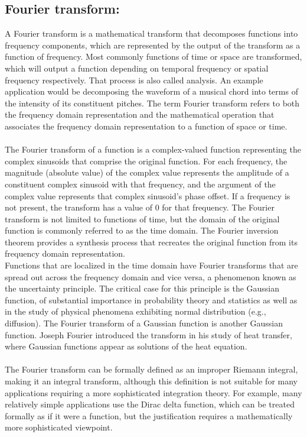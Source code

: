\documentclass[12pt,a4paper]{article}
\begin{document}
\subsection{Fourier transform:}
A Fourier transform is a mathematical transform that decomposes functions into frequency components, which are represented by the output of the transform as a function of frequency. Most commonly functions of time or space are transformed, which will output a function depending on temporal frequency or spatial frequency respectively. That process is also called analysis. An example application would be decomposing the waveform of a musical chord into terms of the intensity of its constituent pitches. The term Fourier transform refers to both the frequency domain representation and the mathematical operation that associates the frequency domain representation to a function of space or time.\\
\\The Fourier transform of a function is a complex-valued function representing the complex sinusoids that comprise the original function. For each frequency, the magnitude (absolute value) of the complex value represents the amplitude of a constituent complex sinusoid with that frequency, and the argument of the complex value represents that complex sinusoid's phase offset. If a frequency is not present, the transform has a value of 0 for that frequency. The Fourier transform is not limited to functions of time, but the domain of the original function is commonly referred to as the time domain. The Fourier inversion theorem provides a synthesis process that recreates the original function from its frequency domain representation.\\
\clearpage
\noindent
Functions that are localized in the time domain have Fourier transforms that are spread out across the frequency domain and vice versa, a phenomenon known as the uncertainty principle. The critical case for this principle is the Gaussian function, of substantial importance in probability theory and statistics as well as in the study of physical phenomena exhibiting normal distribution (e.g., diffusion). The Fourier transform of a Gaussian function is another Gaussian function. Joseph Fourier introduced the transform in his study of heat transfer, where Gaussian functions appear as solutions of the heat equation.\\
\\The Fourier transform can be formally defined as an improper Riemann integral, making it an integral transform, although this definition is not suitable for many applications requiring a more sophisticated integration theory. For example, many relatively simple applications use the Dirac delta function, which can be treated formally as if it were a function, but the justification requires a mathematically more sophisticated viewpoint.\\
\end{document}
